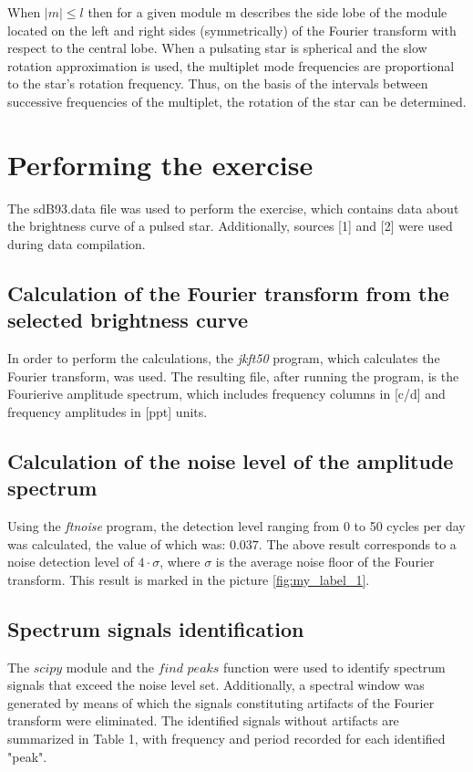 \documentclass{aa}
\begin{document}
When $ |m| \leq l $ then for a given module m describes the side lobe of the module located on the left and right sides (symmetrically) of the Fourier transform with respect to the central lobe. When a pulsating star is spherical and the slow rotation approximation is used, the multiplet mode frequencies are proportional to the star's rotation frequency. Thus, on the basis of the intervals between successive frequencies of the multiplet, the rotation of the star can be determined.
\section{Performing the exercise}

The sdB93.data file was used to perform the exercise, which contains data about the brightness curve of a pulsed star. Additionally, sources [1] and [2] were used during data compilation.

\subsection{Calculation of the Fourier transform from the selected brightness curve}

In order to perform the calculations, the \textit{jkft50} program, which calculates the Fourier transform, was used. The resulting file, after running the program, is the Fourierive amplitude spectrum, which includes frequency columns in [c/d] and frequency amplitudes in [ppt] units.

\subsection{Calculation of the noise level of the amplitude spectrum}

Using the \textit{ftnoise} program, the detection level ranging from 0 to 50 cycles per day was calculated, the value of which was: $ 0.037. $ The above result corresponds to a noise detection level of $ 4 \cdot \sigma $, where $ \sigma $ is the average noise floor of the Fourier transform. This result is marked in the picture \ref{fig:my_label_1}.  

\subsection{Spectrum signals identification}

The $ \textit{scipy} $ module and the $ \textit{find peaks} $ function were used to identify spectrum signals that exceed the noise level set. Additionally, a spectral window was generated by means of which the signals constituting artifacts of the Fourier transform were eliminated. The identified signals without artifacts are summarized in Table 1, with frequency and period recorded for each identified "peak".
\end{document}
